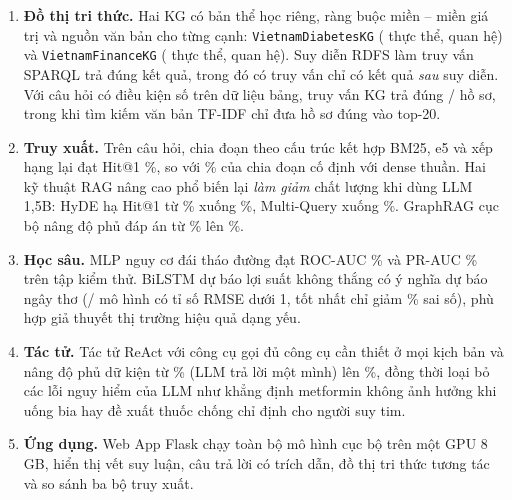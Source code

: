 \begin{enumerate}
  \item \textbf{Đồ thị tri thức.} Hai KG có bản thể học riêng, ràng buộc miền -- miền giá trị và nguồn văn bản cho
        từng cạnh: \texttt{VietnamDiabetesKG} ( thực thể,  quan hệ) và
        \texttt{VietnamFinanceKG} ( thực thể,  quan hệ). Suy diễn RDFS làm
         truy vấn SPARQL trả đúng kết quả, trong đó có truy vấn chỉ có kết quả \emph{sau} suy diễn. Với
        câu hỏi có điều kiện số trên dữ liệu bảng, truy vấn KG trả đúng
        / hồ sơ, trong khi tìm kiếm văn bản
        TF-IDF chỉ đưa  hồ sơ đúng vào top-20.
  \item \textbf{Truy xuất.} Trên  câu hỏi, chia đoạn theo cấu trúc kết hợp BM25,
        e5 và xếp hạng lại đạt Hit@1 \%, so với
        \% của chia đoạn cố định với dense thuần. Hai kỹ thuật RAG nâng
        cao phổ biến lại \emph{làm giảm} chất lượng khi dùng LLM 1,5B: HyDE hạ Hit@1 từ
        \% xuống \%, Multi-Query xuống
        \%. GraphRAG cục bộ nâng độ phủ đáp án từ
        \% lên \%.
  \item \textbf{Học sâu.} MLP nguy cơ đái tháo đường đạt ROC-AUC \% và PR-AUC
        \% trên tập kiểm thử. BiLSTM dự báo lợi suất không thắng có ý nghĩa dự báo ngây thơ
        (/ mô hình có tỉ số RMSE dưới 1, tốt nhất chỉ giảm
        \% sai số), phù hợp giả thuyết thị trường hiệu quả dạng yếu.
  \item \textbf{Tác tử.} Tác tử ReAct với  công cụ gọi đủ công cụ cần thiết ở mọi kịch bản và nâng độ
        phủ dữ kiện từ \% (LLM trả lời một mình) lên
        \%, đồng thời loại bỏ các lỗi nguy hiểm của LLM như khẳng định metformin không
        ảnh hưởng khi uống bia hay đề xuất thuốc chống chỉ định cho người suy tim.
  \item \textbf{Ứng dụng.} Web App Flask chạy toàn bộ mô hình cục bộ trên một GPU 8 GB, hiển thị vết suy luận, câu
        trả lời có trích dẫn, đồ thị tri thức tương tác và so sánh ba bộ truy xuất.
\end{enumerate}

